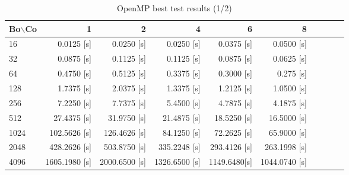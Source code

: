     \begin{table}[h!]
        \centering
        \small
        \begin{tabular}{|l|r|r|r|r|r|r|r|r|r|}
            \hline
            Bo$\backslash$Co & 1             & 2             & 4             & 6            & 8             \\\hline
            16               & 0.0125 [s]    & 0.0250 [s]    & 0.0250 [s]    & 0.0375 [s]   & 0.0500 [s]    \\\hline
            32               & 0.0875 [s]    & 0.1125 [s]    & 0.1125 [s]    & 0.0875 [s]   & 0.0625 [s]    \\\hline
            64               & 0.4750 [s]    & 0.5125 [s]    & 0.3375 [s]    & 0.3000 [s]   & 0.275  [s]    \\\hline
            128              & 1.7375 [s]    & 2.0375 [s]    & 1.3375 [s]    & 1.2125 [s]   & 1.0500 [s]    \\\hline
            256              & 7.2250 [s]    & 7.7375 [s]    & 5.4500 [s]    & 4.7875 [s]   & 4.1875 [s]    \\\hline
            512              & 27.4375 [s]   & 31.9750 [s]   & 21.4875 [s]   & 18.5250 [s]  & 16.5000 [s]   \\\hline
            1024             & 102.5626 [s]  & 126.4626 [s]  & 84.1250 [s]   & 72.2625 [s]  & 65.9000 [s]   \\\hline
            2048             & 428.2626 [s]  & 503.8750 [s]  & 335.2248 [s]  & 293.4126 [s] & 263.1998 [s]  \\\hline
            4096             & 1605.1980 [s] & 2000.6500 [s] & 1326.6500 [s] & 1149.6480[s] & 1044.0740 [s] \\\hline
        \end{tabular}
        \caption{OpenMP best test results (1/2)}
        \label{tab:openmp}
    \end{table}

